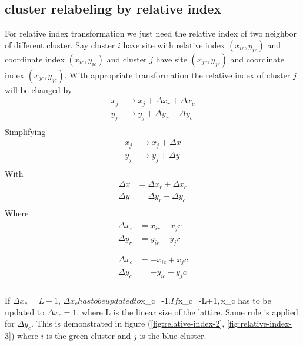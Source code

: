 \subsection{cluster relabeling by relative index}
For relative index transformation we just need the relative index of two neighbor of different cluster. Say cluster $i$ have site with relative index $(x_{ir},y_{ir})$  and coordinate index $(x_{ic},y_{ic})$ and cluster $j$ have site $(x_{jr},y_{jr})$ and coordinate index $(x_{jc},y_{jc})$.
With appropriate transformation the relative index of cluster $j$ will be changed by
\begin{equation}
\begin{split}
	x_j &\rightarrow x_j + \Delta x_r + \Delta x_c \\
	y_j &\rightarrow y_j + \Delta y_r + \Delta y_c \\
\end{split}
\end{equation}
Simplifying
\begin{equation}
\begin{split}
	x_j &\rightarrow x_j + \Delta x \\
	y_j &\rightarrow y_j + \Delta y \\
\end{split}
\end{equation}
With
\begin{equation}
\begin{split}
\Delta x &= \Delta x_r + \Delta x_c  \\
\Delta y &= \Delta y_r + \Delta y_c  \\
\end{split}
\end{equation}
Where
\begin{align}
\begin{split}
\Delta x_r &= x_{ir}-{x_jr}  \\
\Delta y_r &= y_{ir}-{y_jr}  \\
\end{split}
\\
\begin{split}
\Delta x_c &= -x_{ic}+{x_jc} \\
\Delta y_c &= -y_{ic}+{y_jc}  \\
\end{split}
\end{align}

If $\Delta x_c=L-1$, $\Delta x_c has to be updated to $\Delta x_c=-1$. If $\Delta x_c=-L+1$, $\Delta x_c has to be updated to $\Delta x_c=1$, where L is the linear size of the lattice. Same rule is applied for $\Delta y_c$.  This is demonstrated in figure (\ref{fig:relative-index-2}, \ref{fig:relative-index-3}) where $i$ is the green cluster and $j$ is the blue cluster. 

